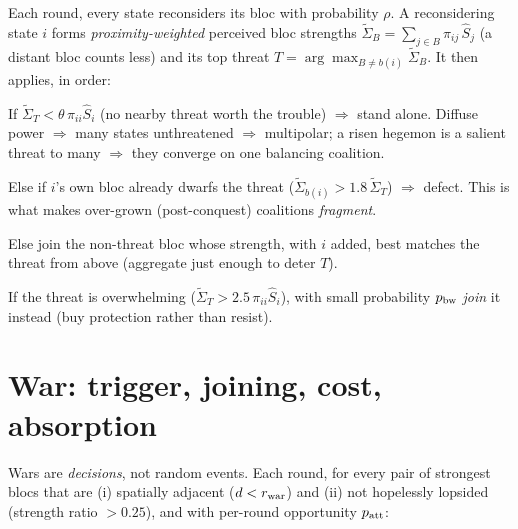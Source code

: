 \documentclass[11pt]{article}
\begin{document}
Each round, every state reconsiders its bloc with probability $\rho$. A
reconsidering state $i$ forms \emph{proximity-weighted} perceived bloc strengths
$\tilde\Sigma_B=\sum_{j\in B}\pi_{ij}\,\hat S_j$ (a distant bloc counts less) and
its top threat $T=\arg\max_{B\neq b(i)}\tilde\Sigma_B$. It then applies, in order:
\begin{description}\itemsep1pt
\item[R1 Salience.] If $\tilde\Sigma_T<\theta\,\pi_{ii}\hat S_i$ (no nearby threat
  worth the trouble) $\Rightarrow$ stand alone. Diffuse power $\Rightarrow$ many
  states unthreatened $\Rightarrow$ multipolar; a risen hegemon is a salient
  threat to many $\Rightarrow$ they converge on one balancing coalition.
\item[R2 Dissolution.] Else if $i$'s own bloc already dwarfs the threat
  ($\tilde\Sigma_{b(i)}>1.8\,\tilde\Sigma_T$) $\Rightarrow$ defect. This is what
  makes over-grown (post-conquest) coalitions \emph{fragment}.
\item[R3 Balancing.] Else join the non-threat bloc whose strength, with $i$
  added, best matches the threat from above (aggregate just enough to deter $T$).
\item[R4 Bandwagon.] If the threat is overwhelming
  ($\tilde\Sigma_T>2.5\,\pi_{ii}\hat S_i$), with small probability $p_{\rm bw}$
  \emph{join} it instead (buy protection rather than resist).
\end{description}

\section{War: trigger, joining, cost, absorption}\label{sec:war}

Wars are \emph{decisions}, not random events. Each round, for every pair of
strongest blocs that are (i) spatially adjacent ($d<r_{\rm war}$) and (ii) not
hopelessly lopsided (strength ratio $>0.25$), and with per-round opportunity
$p_{\rm att}$:
\end{document}
